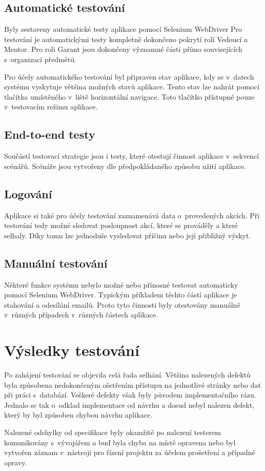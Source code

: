 \documentclass[czech,BP]{thesiskiv}
\begin{document}
	\subsection{Automatické testování}
	\par Byly sestaveny automatické testy aplikace pomocí Selenium WebDriver Pro testování je automatickými testy kompletně dokončeno pokrytí rolí Vedoucí a Mentor. Pro roli Garant jsou dokončeny významné části přímo souvisejících s~organizací předmětů.
	\par Pro účely automatického testování byl připraven stav aplikace, kdy se v~datech systému vyskytuje většina možných stavů aplikace. Tento stav lze nahrát pomocí tlačítka  umístěného v~liště horizontální navigace. Toto tlačítko přístupné pouze v~testovacím režimu aplikace.
	\subsection{End-to-end testy}
	\par Součástí testovací strategie jsou i testy, které otestují činnost aplikace v~sekvencí scénářů. Scénáře jsou vytvořeny dle předpokládaného způsobu užití aplikace.
	\subsection{Logování}
	\par Aplikace si také pro účely testování zaznamenává data o~provedených akcích. Při testování tedy možné sledovat posloupnost akcí, které se prováděly a které selhaly. Díky tomu lze jednoduše vysledovat příčinu nebo její přibližný výskyt.
	\subsection{Manuální testování}
	\par Některé funkce systému nebylo možné nebo přínosné testovat automaticky pomocí Selenium WebDriver. Typickým příkladem těchto částí aplikace je stahování a odesílání emailů. Proto tyto činnosti byly otestovány manuálně v~různých případech v~různých částech aplikace.
	\section{Výsledky testování}
	\par Po zahájení testování se objevila celá řada selhání. Většina nalezených defektů byla způsobena nedokončeným ošetřením přístupu na jednotlivé stránky nebo  dat při práci s~databází. Veškeré defekty však byly původem implementačního rázu. Jednalo se tak o~odklad implementace od návrhu a dosud nebyl nalezen defekt, který by byl způsoben chybou návrhu aplikace.
	\par Nalezené odchylky od specifikace byly okamžitě po nalezení testerem komunikovány s~vývojářem a buď byla chyba na místě opravena nebo byl vytvořen záznam v~nástroji pro řízení projektu za účelem prošetření a případné opravy.  
\end{document}
